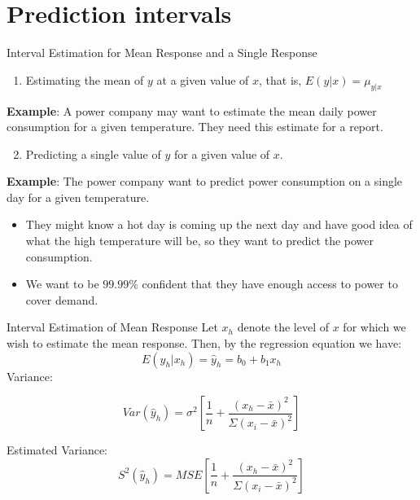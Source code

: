 \documentclass[
  ignorenonframetext,
]{beamer}
\providecommand{\tightlist}{%
  \setlength{\itemsep}{0pt}\setlength{\parskip}{0pt}}
\begin{document}
\section{Prediction intervals}\label{prediction-intervals}

\begin{frame}{Interval Estimation for Mean Response and a Single
Response}
\protect{}\label{interval-estimation-for-mean-response-and-a-single-response}
\begin{enumerate}
\tightlist
\item
  Estimating the mean of \(y\) at a given value of \(x\), that is,
  \(E(y|x)=\mu_{y|x}\)
\end{enumerate}

\textbf{Example}: A power company may want to estimate the mean daily
power consumption for a given temperature. They need this estimate for a
report.

\begin{enumerate}
\setcounter{enumi}{1}
\tightlist
\item
  Predicting a single value of \(y\) for a given value of \(x\).
\end{enumerate}

\textbf{Example}: The power company want to predict power consumption on
a single day for a given temperature.

\begin{itemize}
\item
  They might know a hot day is coming up the next day and have good idea
  of what the high temperature will be, so they want to predict the
  power consumption.
\item
  We want to be \(99.99\%\) confident that they have enough access to
  power to cover demand.
\end{itemize}
\end{frame}

\begin{frame}{Interval Estimation of Mean Response}
\protect{}\label{interval-estimation-of-mean-response}
Let \(x_h\) denote the level of \(x\) for which we wish to estimate the
mean response. Then, by the regression equation we have:
\[E(y_h|x_h)=\hat{y}_h=b_0+b_1x_h\] Variance:

\[Var(\hat{y}_h)=\sigma^2\left[\frac{1}{n}+\frac{(x_h-\bar{x})^2}{\Sigma(x_i-\bar{x})^2}\right]\]

Estimated Variance:
\[S^2(\hat{y}_h)=MSE\left[\frac{1}{n}+\frac{(x_h-\bar{x})^2}{\Sigma(x_i-\bar{x})^2}\right]\]
\end{frame}
\end{document}
